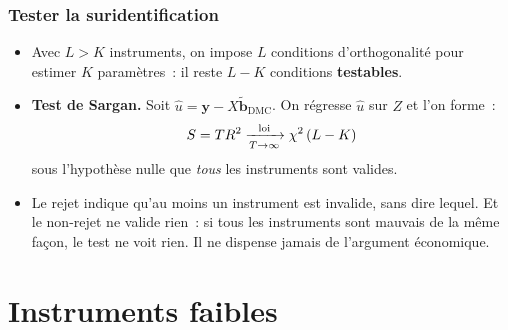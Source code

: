 \documentclass[10pt]{beamer}
\begin{document}
\begin{frame}
  \frametitle{Tester la suridentification}

  \begin{itemize}

  \item Avec $L>K$ instruments, on impose $L$ conditions d'orthogonalité pour
    estimer $K$ paramètres~: il reste $L-K$ conditions \textbf{testables}.\newline

  \item \textbf{Test de Sargan.} Soit
    $\hat u = \mathbf y - X\tilde{\mathbf b}_{\text{DMC}}$. On régresse $\hat u$
    sur $Z$ et l'on forme~:
    \[
      S = T R^2 \xrightarrow[T\rightarrow\infty]{\text{loi}} \chi^2\left( L-K \right)
    \]
    sous l'hypothèse nulle que \emph{tous} les instruments sont valides.\newline

  \item[\dbend] Le rejet indique qu'au moins un instrument est invalide, sans
    dire lequel. Et le non-rejet ne valide rien~: si tous les instruments sont
    mauvais de la même façon, le test ne voit rien. Il ne dispense jamais de
    l'argument économique.

  \end{itemize}

\end{frame}


\section{Instruments faibles}
\end{document}
